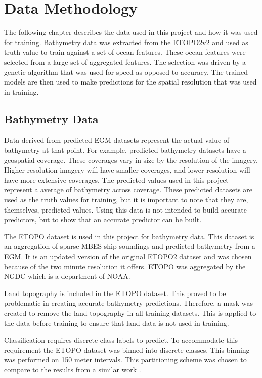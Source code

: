 \section{Data Methodology}
\setlength{\parindent}{10ex}
The following chapter describes the data used in this project and how it was used for training.
Bathymetry data was extracted from the \ac{ETOPO}2v2 and used as truth value to train against a set of ocean features.
These ocean features were selected from a large set of aggregated features.
The selection was driven by a genetic algorithm that was used for speed as opposed to accuracy.
The trained models are then used to make predictions for the spatial resolution that was used in training.

\subsection{Bathymetry Data}
Data derived from predicted \ac{EGM} datasets represent the actual value of bathymetry at that point.
For example, predicted bathymetry datasets have a geospatial coverage.
These coverages vary in size by the resolution of the imagery.
Higher resolution imagery will have smaller coverages, and lower resolution will have more extensive coverages.
The predicted values used in this project represent a average of bathymetry across coverage. 
These predicted datasets are used as the truth values for training, but it is important to note that they are, themselves, predicted values.
Using this data is not intended to build accurate predictors, but to show that an accurate predictor can be built.

\par
The \ac{ETOPO} dataset is used in this project for bathymetry data.
This dataset is an aggregation of sparse \ac{MBES} ship soundings and predicted bathymetry from a \ac{EGM}.
It is an updated version of the original ETOPO2 dataset and was chosen because of the two minute resolution it offers.
\ac{ETOPO} was aggregated by the \ac{NGDC} which is a department of \ac{NOAA}.

\par
Land topography is included in the \ac{ETOPO} dataset.
This proved to be problematic in creating accurate bathymetry predictions.
Therefore, a mask was created to remove the land topography in all training datasets.
This is applied to the data before training to ensure that land data is not used in training.

\par
Classification requires discrete class labels to predict.
To accommodate this requirement the \ac{ETOPO} dataset was binned into discrete classes.
This binning was performed on 150 meter intervals.
This partitioning scheme was chosen to compare to the results from a similar work \cite{jena2012prediction}.

